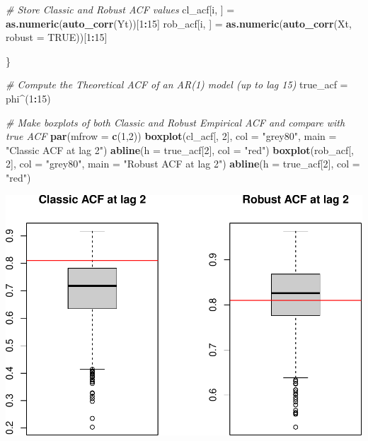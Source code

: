 \documentclass[]{book}
\newenvironment{Shaded}{\begin{snugshade}}{\end{snugshade}}
\newcommand{\CommentTok}[1]{\textcolor[rgb]{0.56,0.35,0.01}{\textit{#1}}}
\newcommand{\DataTypeTok}[1]{\textcolor[rgb]{0.13,0.29,0.53}{#1}}
\newcommand{\DecValTok}[1]{\textcolor[rgb]{0.00,0.00,0.81}{#1}}
\newcommand{\KeywordTok}[1]{\textcolor[rgb]{0.13,0.29,0.53}{\textbf{#1}}}
\newcommand{\NormalTok}[1]{#1}
\newcommand{\OperatorTok}[1]{\textcolor[rgb]{0.81,0.36,0.00}{\textbf{#1}}}
\newcommand{\OtherTok}[1]{\textcolor[rgb]{0.56,0.35,0.01}{#1}}
\newcommand{\StringTok}[1]{\textcolor[rgb]{0.31,0.60,0.02}{#1}}
\theoremstyle{definition}
\theoremstyle{definition}
\theoremstyle{definition}
\theoremstyle{remark}
\begin{document}
\begin{Shaded}
\begin{Highlighting}[]
  \CommentTok{# Store Classic and Robust ACF values}
\NormalTok{  cl_acf[i, ] =}\StringTok{ }\KeywordTok{as.numeric}\NormalTok{(}\KeywordTok{auto_corr}\NormalTok{(Yt))[}\DecValTok{1}\OperatorTok{:}\DecValTok{15}\NormalTok{]}
\NormalTok{  rob_acf[i, ] =}\StringTok{ }\KeywordTok{as.numeric}\NormalTok{(}\KeywordTok{auto_corr}\NormalTok{(Xt, }\DataTypeTok{robust =} \OtherTok{TRUE}\NormalTok{))[}\DecValTok{1}\OperatorTok{:}\DecValTok{15}\NormalTok{]}
  
\NormalTok{\}}

\CommentTok{# Compute the Theoretical ACF of an AR(1) model (up to lag 15)}
\NormalTok{true_acf =}\StringTok{ }\NormalTok{phi}\OperatorTok{^}\NormalTok{(}\DecValTok{1}\OperatorTok{:}\DecValTok{15}\NormalTok{)}

\CommentTok{# Make boxplots of both Classic and Robust Empirical ACF and compare with true ACF}
\KeywordTok{par}\NormalTok{(}\DataTypeTok{mfrow =} \KeywordTok{c}\NormalTok{(}\DecValTok{1}\NormalTok{,}\DecValTok{2}\NormalTok{))}
\KeywordTok{boxplot}\NormalTok{(cl_acf[, }\DecValTok{2}\NormalTok{], }\DataTypeTok{col =} \StringTok{"grey80"}\NormalTok{, }\DataTypeTok{main =} \StringTok{"Classic ACF at lag 2"}\NormalTok{)}
\KeywordTok{abline}\NormalTok{(}\DataTypeTok{h =}\NormalTok{ true_acf[}\DecValTok{2}\NormalTok{], }\DataTypeTok{col =} \StringTok{"red"}\NormalTok{)}
\KeywordTok{boxplot}\NormalTok{(rob_acf[, }\DecValTok{2}\NormalTok{], }\DataTypeTok{col =} \StringTok{"grey80"}\NormalTok{, }\DataTypeTok{main =} \StringTok{"Robust ACF at lag 2"}\NormalTok{)}
\KeywordTok{abline}\NormalTok{(}\DataTypeTok{h =}\NormalTok{ true_acf[}\DecValTok{2}\NormalTok{], }\DataTypeTok{col =} \StringTok{"red"}\NormalTok{)}
\end{Highlighting}
\end{Shaded}

\includegraphics{ts_files/figure-latex/simulationRobust2-1.pdf}
\end{document}
